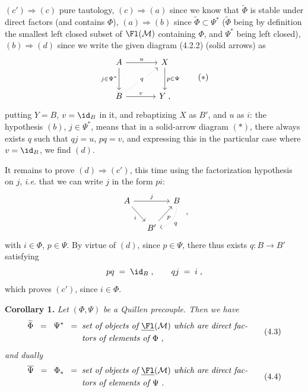 $(c')\Longrightarrow(c)$ pure tautology, $(c)\Longrightarrow(a)$ since we know that $\widetilde{\Phi}$ is stable under direct factors (and contains $\Phi$), $(a)\Longrightarrow(b)$ since $\widetilde{\Phi}\subset\Psi^*$ ($\widetilde{\Phi}$ being by definition the smallest left closed subset of $\Fl(\mathcal{M})$ containing $\Phi$, and $\Psi^*$ being left closed), $(b)\Longrightarrow(d)$ since we write the given diagram (4.2.2) (solid arrows) as %
\[
\begin{tikzcd}[row sep=large, column sep=large]
A \arrow[r, "u"] \arrow[d, "j\in\Psi^*"'] & X \arrow[d, "p\in\Psi"] \\
B \arrow[ur, dotted, "q" description] \arrow[r, "v"] & Y \;,
\end{tikzcd}
\tag*{$(*)$}
\]
putting $Y=B$, $v=\id_B$ in it, and rebaptizing $X$ as $B'$, and $u$ as $i$: the hypothesis $(b)$, $j\in\Psi^*$, means that in a solid-arrow diagram $(*)$, there always exists $q$ such that $qj=u$, $pq=v$, and expressing this in the particular case where $v=\id_B$, we find $(d)$.

It remains to prove $(d)\Longrightarrow(c')$, this time using the factorization hypothesis on $j$, \textit{i.e.} that we can write $j$ in the form $pi$:
\[
\begin{tikzcd}[column sep=small]
A \arrow[rr, "j"] \arrow[dr, "i"'] & & B \arrow[dl, dotted, bend left=40, "q"] \\
& B' \arrow[ur, "p"'] &
\end{tikzcd}
\;,
\]
with $i\in\Phi$, $p\in\Psi$. By virtue of $(d)$, since $p\in\Psi$, there thus exists $q:B\longrightarrow B'$ satisfying
\[
pq \;=\; \id_B\;, \qquad qj \;=\; i\;,
\]
which proves $(c')$, since $i\in\Phi$.

\textbf{Corollary 1.} \textit{Let} $(\Phi,\Psi)$ \textit{be a Quillen precouple. Then we have}
\[
\begin{aligned}
\widetilde{\Phi} \;\;=\;\; \Psi^* \;\;=\;\; &\textit{set of objects of } \underline{\Fl}(\mathcal{M}) \textit{ which are direct fac-}\\
&\textit{tors of elements of } \Phi\ ,
\end{aligned}
\tag*{(4.3)}
\] %
\textit{and dually}
\[
\begin{aligned}
\overline{\Psi} \;\;=\;\; \Phi_* \;\;=\;\; &\textit{set of objects of } \underline{\Fl}(\mathcal{M}) \textit{ which are direct fac-}\\
&\textit{tors of elements of } \Psi\ .
\end{aligned}
\tag*{(4.4)}
\] %

